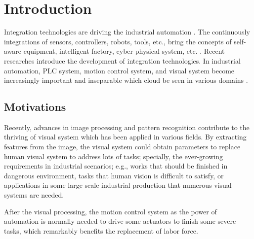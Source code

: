 \documentclass[journal,UTF8]{IEEEtran}
\begin{document}
%
\IEEEpeerreviewmaketitle



\section{Introduction}
Integration technologies are driving the industrial automation \cite{Kazmierkowski2007Integration}. The continuously integrations of sensors, controllers, robots, tools, etc., bring the concepts of self-aware equipment, intelligent factory, cyber-physical system, etc. \cite{Wan2018An,Chekired2018Industrial}. Recent researches \cite{Colombo2006An,Vaccaro2010An,Dean2017Integration} introduce the development of integration technologies. In industrial automation, PLC system,  motion control system, and visual system become increasingly important and inseparable which cloud be seen in various domains \cite{Feng2002Integrating,Chang2006Motion,Feng2005Practical}. %

\subsection{Motivations}
Recently, advances in image processing and pattern recognition contribute to the thriving of visual system which has been applied in various fields. By extracting features from the image, the visual system could obtain parameters to replace human visual system to address lots of tasks; specially, the ever-growing requirements in industrial scenarios; e.g., works that should be finished in dangerous environment, tasks that human vision is difficult to satisfy, or applications in some large scale industrial production that numerous visual systems are needed. 

After the visual processing, the motion control system as the power of automation is normally needed to drive some actuators to finish some severe tasks, which remarkably benefits the replacement of labor force. 
\end{document}
